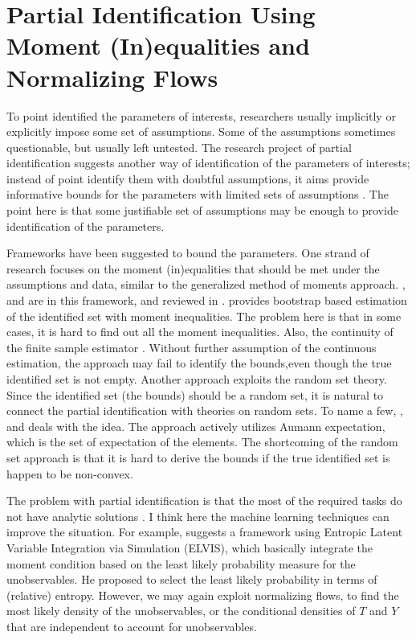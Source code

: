\documentclass[10pt]{extarticle}
\begin{document}
\newpage
\section{Partial Identification Using Moment (In)equalities and Normalizing Flows}
To point identified the parameters of interests, researchers usually implicitly or explicitly impose some set of assumptions. Some of the assumptions sometimes questionable, but usually left untested. The research project of partial identification suggests another way of identification of the parameters of interests; instead of point identify them with doubtful assumptions, it aims provide informative bounds for the parameters with limited sets of assumptions \citet{Manski1990a}. The point here is that some justifiable set of assumptions may be enough to provide identification of the parameters. 

Frameworks have been suggested to bound the parameters. One strand of research focuses on the moment (in)equalities that should be met under the assumptions and data, similar to the generalized method of moments approach. \citet{Andrews2010a, Schennach2014a}, and \citet{Ho2015a} are in this framework, and reviewed in \citet{Canay2017a}. \cite{Chernozhukov2007a} provides bootstrap based estimation of the identified set with moment inequalities. The problem here is that in some cases, it is hard to find out all the moment inequalities. Also, the continuity of the finite sample estimator \citep{Kline2023a}. Without further assumption of the continuous estimation, the approach may fail to identify the bounds,even though the true identified set is not empty. Another approach exploits the random set theory. Since the identified set (the bounds) should be a random set, it is natural to connect the partial identification with theories on random sets. To name a few, \citet{Molchanov2005a, Molinari2010a, Beresteanu2012a}, and \citet{Molchanov2018a} deals with the idea. The approach actively utilizes Aumann expectation, which is the set of expectation of the elements. The shortcoming of the random set approach is that it is hard to derive the bounds if the true identified set is happen to be non-convex. 

The problem with partial identification is that the most of the required tasks do not have analytic solutions \citep{Molinari2020a, Schennach2020a}. I think here the machine learning techniques can improve the situation. For example, \citet{Schennach2014a} suggests a framework using Entropic Latent Variable Integration via Simulation (ELVIS), which basically integrate the moment condition based on the least likely probability measure for the unobservables. He proposed to select the least likely probability in terms of (relative) entropy. However, we may again exploit normalizing flows, to find the most likely density of the unobservables, or the conditional densities of $T$ and $Y$ that are independent to account for unobservables. 
\end{document}
